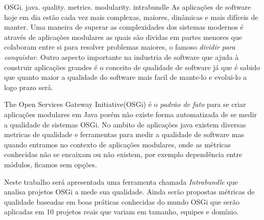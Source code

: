 \begin{englishabstract}{}{OSGi. java. quality. metrics. modularity. intrabundle}
As aplicações de software hoje em dia estão cada vez mais complexas, maiores, dinâmicas e mais difíceis de manter. Uma maneira de superar as complexidades dos sistemas modernos é através de aplicações modulares as quais são dividas em partes menores que colaboram entre si para resolver problemas maiores, o famoso \emph{dividir para conquistar}. Outro aspecto importante na industria de software que ajuda à construir aplicações grandes é o conceito de qualidade de software já que é sabido que quanto maior a qualidade do software mais facil de mante-lo e evolui-lo a logo prazo será.

The Open Services Gateway Initiative(OSGi) é o \emph{padrão de fato} para se criar aplicações modulares em Java porém não existe forma automatizada de se medir a qualidade de sistemas OSGi. No ambito de aplicações java existem diversas metricas de qualidade e ferramentas para medir a qualidade de software mas quando entramos no contexto de aplicações modulares, onde as métricas conhecidas não se encaixam ou não existem, por exemplo dependência entre módulos, ficamos sem opções. 

Neste trabalho será apresentada uma ferramenta chamada \emph{Intrabundle} que analisa projetos OSGi a mede sua qualidade. Ainda serão propostas métricas de qualidade baseadas em boas práticas conhecidas do mundo OSGi que serão aplicadas em 10 projetos reais que variam em tamanho, equipes e domínio.
\end{englishabstract}
